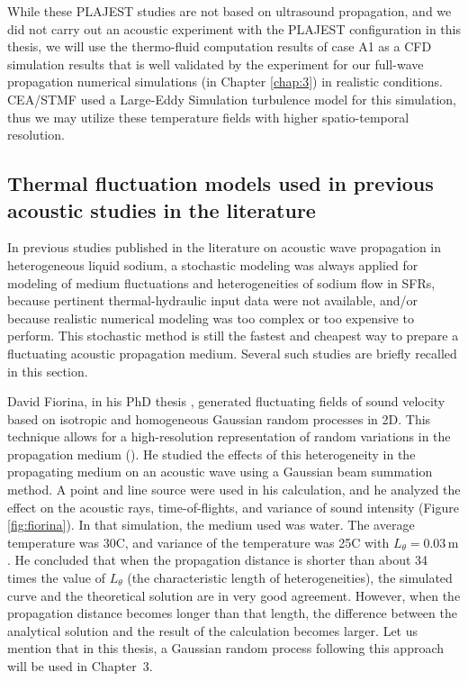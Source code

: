    While these PLAJEST studies are not based on ultrasound propagation, and we did not carry out an acoustic experiment with the PLAJEST configuration
in this thesis, we will use the thermo-fluid computation results of case A1 as a CFD simulation results that is well validated by the experiment for our
full-wave propagation numerical simulations (in Chapter \ref{chap:3}) in realistic conditions.
CEA/STMF used a Large-Eddy Simulation turbulence model for this simulation, thus we may utilize these temperature fields with higher spatio-temporal resolution.

\subsection{Thermal fluctuation models used in previous acoustic studies in the literature} \label{ssec:fluc_mod}

    In previous studies published in the literature on acoustic wave propagation in heterogeneous liquid sodium,
a stochastic modeling was always applied for modeling of medium fluctuations
and heterogeneities of sodium flow in SFRs, because pertinent thermal-hydraulic input data were not available, and/or because realistic numerical modeling was too complex
or too expensive to perform. This stochastic method is still the fastest and cheapest way to prepare a
fluctuating acoustic propagation medium. Several such studies are briefly recalled in this section.

    David Fiorina, in his PhD thesis \parencite{Fiorina1998Applicationofthe}, generated fluctuating fields of sound velocity based on isotropic and homogeneous
Gaussian random processes in 2D.
This technique allows for a high-resolution representation of random variations in the propagation medium (\parencite{VladimirE.Ostashev2015AcousticsMovingInhomogeneous}).
He studied the effects of this heterogeneity in the propagating medium on an acoustic wave using a Gaussian beam summation
method. A point and line source were used in his calculation, and he analyzed the effect on the acoustic rays, time-of-flights, and variance of sound intensity
(Figure \ref{fig:fiorina}). In that simulation, the medium used was water. The average temperature was \num{30}\textdegree{}C, and variance of the temperature
was \num{25}\textdegree{}C with $L_{\theta}=0.03\, \text{m}$. He concluded that when the propagation distance is shorter than about \num{34} times the value of
$L_{\theta}$ (the characteristic length of heterogeneities), the simulated curve and the theoretical solution are in very good agreement. However, when the propagation distance
becomes longer than that length, the difference between the analytical solution and the result of the calculation becomes larger.
Let us mention that in this thesis, a Gaussian random process following this approach will be used in Chapter~3.

